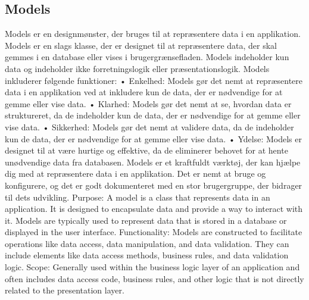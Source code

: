 \subsection{Models}
Models er en designmønster, der bruges til at repræsentere data i en applikation. Models er en slags klasse, der er designet til at repræsentere data, der skal gemmes i en database eller vises i brugergrænsefladen. 
Models indeholder kun data og indeholder ikke forretningslogik eller præsentationslogik.
Models inkluderer følgende funktioner:
•	Enkelhed: Models gør det nemt at repræsentere data i en applikation ved at inkludere kun de data, der er nødvendige for at gemme eller vise data.
•	Klarhed: Models gør det nemt at se, hvordan data er struktureret, da de indeholder kun de data, der er nødvendige for at gemme eller vise data.
•	Sikkerhed: Models gør det nemt at validere data, da de indeholder kun de data, der er nødvendige for at gemme eller vise data.
•	Ydelse: Models er designet til at være hurtige og effektive, da de eliminerer behovet for at hente unødvendige data fra databasen.
Models er et kraftfuldt værktøj, der kan hjælpe dig med at repræsentere data i en applikation. Det er nemt at bruge og konfigurere, og det er godt dokumenteret med en stor brugergruppe, der bidrager til dets udvikling.
Purpose: A model is a class that represents data in an application. It is designed to encapsulate data and provide a way to interact with it. Models are typically used to represent data that is stored in a database or displayed in the user interface.
Functionality: Models are constructed to facilitate operations like data access, data manipulation, and data validation. They can include elements like data access methods, business rules, and data validation logic.
Scope: Generally used within the business logic layer of an application and often includes data access code, business rules, and other logic that is not directly related to the presentation layer.

